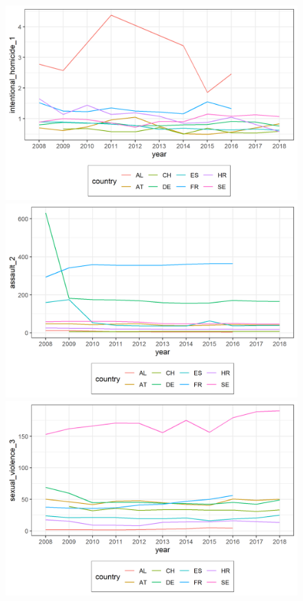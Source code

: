 \documentclass[a4paper,12pt]{article}
\begin{document}
\begin{figure}

\begin{minipage}{0.45\textwidth}
  \includegraphics[trim={0 0 0 0},width=\linewidth]{charts/des_line_intentional_homicide_1_.png}
\end{minipage}
\begin{minipage}{0.45\textwidth}
  \includegraphics[trim={0 0 0 0},width=\linewidth]{charts/des_line_assault_2_.png}
\end{minipage}
\begin{minipage}{0.45\textwidth}
  \includegraphics[trim={0 0 0 0},width=\linewidth]{charts/des_line_sexual_violence_3_.png}

\end{minipage}
\end{figure}
\end{document}
